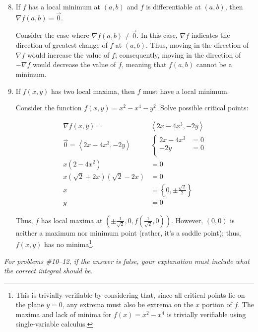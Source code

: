 \documentclass[11pt]{article}
\begin{document}
\begin{enumerate}
  \setcounter{enumi}{7}

\item If \(f\) has a local minimum at \((a,b)\) and \(f\) is differentiable at
  \((a,b)\), then \(\nabla f (a,b) = \vec{0}\).

  Consider the case where \(\nabla f(a, b) \neq \vec{0}\). In this case,
  \(\nabla f\) indicates the direction of greatest change of \(f\) at
  \((a, b)\). Thus, moving in the direction of \(\nabla f\) would increase the
  value of \(f\); consequently, moving in the direction of \(-\nabla f\) would
  decrease the value of \(f\), meaning that \(f(a, b)\) cannot be a minimum.

\item If \(f(x,y)\) has two local maxima, then \(f\) must have a local minimum.

  Consider the function \(f(x, y) = x^2 - x^4 - y^2\). Solve possible
  critical points:

  \begin{align*}
    \nabla f(x, y) = &\left< 2x - 4x^3, -2y \right> \\
    \vec{0} = \left< 2x - 4x^3, -2y \right>
    &\begin{cases}
      2x - 4x^3 &= 0 \\
      -2y &= 0 \\
    \end{cases} \\
    x(2 - 4x^2) &= 0 \\
    x(\sqrt{2} + 2x)(\sqrt{2} - 2x) &= 0 \\
    x &= \left\{ 0, \pm \frac{\sqrt{2}}{2} \right\} \\
    y &= 0
  \end{align*}

  Thus, \(f\) has local maxima at
  \((\pm \frac{1}{\sqrt{2}}, 0, f(\frac{1}{\sqrt{2}}, 0))\). However, \((0, 0)\)
  is neither a maximum nor minimum point (rather, it's a saddle point); thus,
  \(f(x, y)\) has no minima\footnote{This is trivially verifiable by considering
    that, since all critical points lie on the plane \(y = 0\), any extrema must
    also be extrema on the \(x\) portion of \(f\). The maxima and lack of minima
    for \(f(x) = x^2 - x^4\) is trivially verifiable using single-variable
    calculus.}.
\end{enumerate}

\textit{For problems \#10--12, if the answer is false, your explanation must include what the correct integral should be.}
\end{document}
